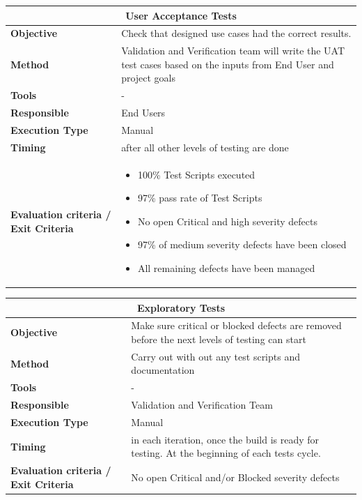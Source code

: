 \begin{center}
\begin{longtable}[H]{|p{4cm}|p{9cm}|}\hline
\multicolumn{2}{|c|}{\textbf{User Acceptance Tests}}\\\hline
\textbf{Objective} &  Check that designed use cases had the correct results.\\\hline
\textbf{Method} & Validation and Verification team will write the UAT test cases based on the inputs from End User and project goals \\\hline
\textbf{Tools} & -\\\hline
\textbf{Responsible} & End Users\\\hline
\textbf{Execution Type} & Manual\\\hline
\textbf{Timing} & after all other levels of testing are done \\\hline
\textbf{Evaluation criteria / Exit Criteria} & \begin{itemize}
\item 100\% Test Scripts executed
\item 97\% pass rate of Test Scripts
\item No open Critical and high severity defects
\item 97\% of medium severity defects have been closed 
\item All remaining defects have been managed
\end{itemize} \\\hline
\end{longtable}
\end{center}

\begin{center}
\begin{longtable}[H]{|p{4cm}|p{9cm}|}\hline
\multicolumn{2}{|c|}{\textbf{Exploratory Tests}}\\\hline
\textbf{Objective} &  Make sure critical or blocked defects are removed before the next levels of testing can start\\\hline
\textbf{Method} & Carry out with out any test scripts and documentation \\\hline
\textbf{Tools} & -\\\hline
\textbf{Responsible} & Validation and Verification Team\\\hline
\textbf{Execution Type} & Manual\\\hline
\textbf{Timing} & in each iteration, once the build is ready for testing. At the beginning of each tests cycle.  \\\hline
\textbf{Evaluation criteria / Exit Criteria} & No open Critical and/or Blocked severity defects \\\hline
\end{longtable}
\end{center}



